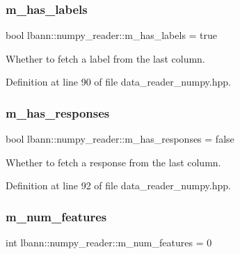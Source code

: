 \subsubsection{\texorpdfstring{m\+\_\+has\+\_\+labels}{m\_has\_labels}}
{\footnotesize\ttfamily bool lbann\+::numpy\+\_\+reader\+::m\+\_\+has\+\_\+labels = true\hspace{0.3cm}{\ttfamily [protected]}}



Whether to fetch a label from the last column. 



Definition at line 90 of file data\+\_\+reader\+\_\+numpy.\+hpp.

\mbox{\label{classlbann_1_1numpy__reader_a7567338be86dff81afece19d031a942d}} 
\subsubsection{\texorpdfstring{m\+\_\+has\+\_\+responses}{m\_has\_responses}}
{\footnotesize\ttfamily bool lbann\+::numpy\+\_\+reader\+::m\+\_\+has\+\_\+responses = false\hspace{0.3cm}{\ttfamily [protected]}}



Whether to fetch a response from the last column. 



Definition at line 92 of file data\+\_\+reader\+\_\+numpy.\+hpp.

\mbox{\label{classlbann_1_1numpy__reader_aef25f95077f565fa9616ec353b93f675}} 
\subsubsection{\texorpdfstring{m\+\_\+num\+\_\+features}{m\_num\_features}}
{\footnotesize\ttfamily int lbann\+::numpy\+\_\+reader\+::m\+\_\+num\+\_\+features = 0\hspace{0.3cm}{\ttfamily [protected]}}



